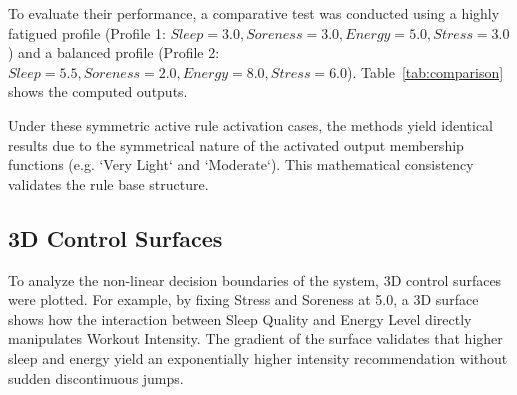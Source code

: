 \documentclass[conference]{IEEEtran}
\begin{document}
To evaluate their performance, a comparative test was conducted using a highly fatigued profile (Profile 1: $Sleep=3.0, Soreness=3.0, Energy=5.0, Stress=3.0$) and a balanced profile (Profile 2: $Sleep=5.5, Soreness=2.0, Energy=8.0, Stress=6.0$). Table~\ref{tab:comparison} shows the computed outputs.

\begin{table}[htbp]
\caption{Comparison of Defuzzification Methods}
\label{tab:comparison}
\begin{center}
\end{center}
\end{table}

Under these symmetric active rule activation cases, the methods yield identical results due to the symmetrical nature of the activated output membership functions (e.g. `Very Light` and `Moderate`). This mathematical consistency validates the rule base structure.

\subsection{3D Control Surfaces}
To analyze the non-linear decision boundaries of the system, 3D control surfaces were plotted. For example, by fixing Stress and Soreness at 5.0, a 3D surface shows how the interaction between Sleep Quality and Energy Level directly manipulates Workout Intensity. The gradient of the surface validates that higher sleep and energy yield an exponentially higher intensity recommendation without sudden discontinuous jumps.
\end{document}
